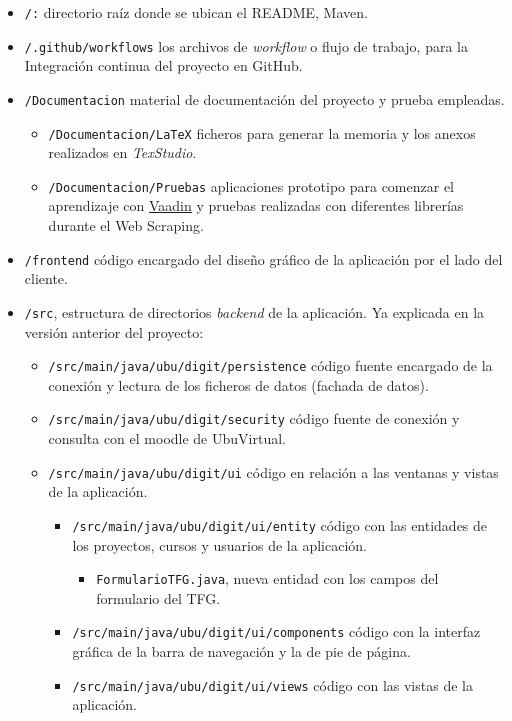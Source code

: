 \begin{itemize}
	\item \texttt{/:} directorio raíz donde se ubican el README, Maven. 
	\item \texttt{/.github/workflows} los archivos de \textit{workflow} o flujo de trabajo, para la Integración continua del proyecto en GitHub.
	\item \texttt{/Documentacion} material de documentación del proyecto y prueba empleadas.
	\begin{itemize}
		\tightlist
		\item \texttt{/Documentacion/LaTeX} ficheros para generar la memoria y los anexos realizados en \emph{TexStudio}.
		\item \texttt{/Documentacion/Pruebas} aplicaciones prototipo para comenzar el aprendizaje con \href{https://vaadin.com/}{Vaadin} y pruebas realizadas con diferentes librerías durante el Web Scraping.
	\end{itemize}
	\item \texttt{/frontend} código encargado del diseño gráfico de la aplicación por el lado del cliente.
	\item \texttt{/src}, estructura de directorios \emph{backend} de la aplicación. Ya explicada en la versión anterior del proyecto:
		\begin{itemize}
			\item \texttt{/src/main/java/ubu/digit/persistence} código fuente encargado de la conexión y lectura de los ficheros de datos (fachada de datos).		
			\item \texttt{/src/main/java/ubu/digit/security} código fuente de conexión y consulta con el moodle de UbuVirtual.
			\item \texttt{/src/main/java/ubu/digit/ui} código en relación a las ventanas y vistas de la aplicación.
			\begin{itemize}
				\item \texttt{/src/main/java/ubu/digit/ui/entity} código con las entidades de los proyectos, cursos y usuarios de la aplicación.
					\begin{itemize}		
						\item \texttt{FormularioTFG.java}, nueva entidad con los campos del formulario del TFG.
					\end{itemize}
				\item \texttt{/src/main/java/ubu/digit/ui/components} código con la interfaz gráfica de la barra de navegación y la de pie de página.
				\item \texttt{/src/main/java/ubu/digit/ui/views} código con las vistas de la aplicación.

\end{itemize}
\end{itemize}
\end{itemize}
